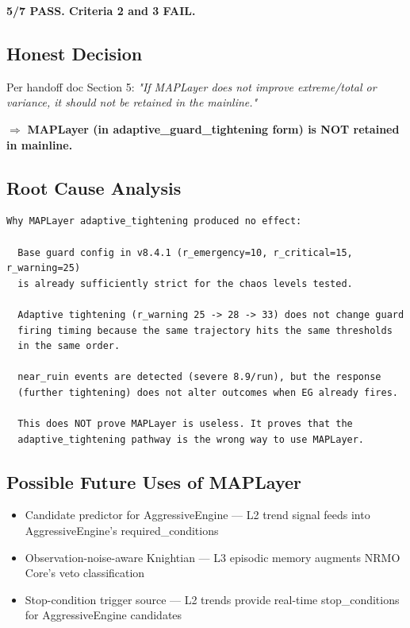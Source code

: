 \documentclass[11pt,a4paper]{article}
\begin{document}
\textbf{5/7 PASS. Criteria 2 and 3 FAIL.}

\subsection{Honest Decision}

Per handoff doc Section 5: \textit{"If MAPLayer does not improve extreme/total or variance, it should not be retained in the mainline."}

$\Rightarrow$ \textbf{MAPLayer (in adaptive\_guard\_tightening form) is NOT retained in mainline.}

\subsection{Root Cause Analysis}

\begin{verbatim}
Why MAPLayer adaptive_tightening produced no effect:

  Base guard config in v8.4.1 (r_emergency=10, r_critical=15, r_warning=25)
  is already sufficiently strict for the chaos levels tested.

  Adaptive tightening (r_warning 25 -> 28 -> 33) does not change guard
  firing timing because the same trajectory hits the same thresholds
  in the same order.

  near_ruin events are detected (severe 8.9/run), but the response
  (further tightening) does not alter outcomes when EG already fires.

  This does NOT prove MAPLayer is useless. It proves that the
  adaptive_tightening pathway is the wrong way to use MAPLayer.
\end{verbatim}

\subsection{Possible Future Uses of MAPLayer}

\begin{itemize}
  \item[(A)] Candidate predictor for AggressiveEngine — L2 trend signal feeds into AggressiveEngine's required\_conditions
  \item[(B)] Observation-noise-aware Knightian — L3 episodic memory augments NRMO Core's veto classification
  \item[(C)] Stop-condition trigger source — L2 trends provide real-time stop\_conditions for AggressiveEngine candidates
\end{itemize}
\end{document}
